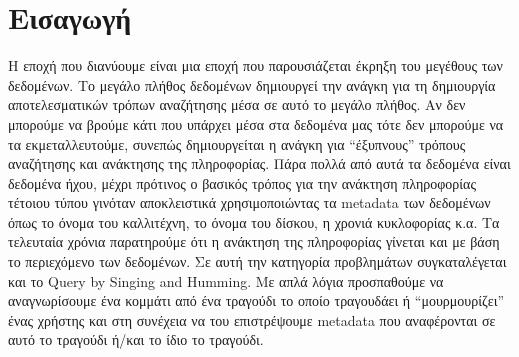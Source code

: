 \section{Εισαγωγή}
Η εποχή που διανύουμε είναι μια εποχή που παρουσιάζεται έκρηξη του μεγέθους των
δεδομένων. Το μεγάλο πλήθος δεδομένων δημιουργεί την ανάγκη για τη δημιουργία
αποτελεσματικών τρόπων αναζήτησης μέσα σε αυτό το μεγάλο πλήθος. Αν δεν
μπορούμε να βρούμε κάτι που υπάρχει μέσα στα δεδομένα μας τότε δεν μπορούμε να
τα εκμεταλλευτούμε, συνεπώς δημιουργείται η ανάγκη για “έξυπνους” τρόπους
αναζήτησης και ανάκτησης της πληροφορίας. Πάρα πολλά από αυτά τα δεδομένα
είναι δεδομένα ήχου, μέχρι πρότινος ο βασικός τρόπος για την ανάκτηση
πληροφορίας τέτοιου τύπου γινόταν αποκλειστικά χρησιμοποιώντας τα metadata
των δεδομένων όπως το όνομα του καλλιτέχνη, το όνομα του δίσκου, η χρονιά
κυκλοφορίας κ.α. Τα τελευταία χρόνια παρατηρούμε ότι η ανάκτηση της πληροφορίας
γίνεται και με βάση το περιεχόμενο των δεδομένων. Σε αυτή την κατηγορία
προβλημάτων συγκαταλέγεται και το Query by Singing and Humming. Με απλά λόγια
προσπαθούμε να αναγνωρίσουμε ένα κομμάτι από ένα τραγούδι το οποίο τραγουδάει
ή “μουρμουρίζει” ένας χρήστης και στη συνέχεια να του επιστρέψουμε metadata
που αναφέρονται σε αυτό το τραγούδι ή/και το ίδιο το τραγούδι.
